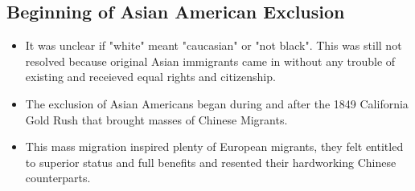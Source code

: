 \documentclass{article}
\begin{document}
\subsection{Beginning of Asian American Exclusion}
\begin{itemize}
  \item It was unclear if "white" meant "caucasian" or "not black".
    This was still not resolved because original Asian immigrants came in 
    without any trouble of existing and receieved equal rights and citizenship.
  \item The exclusion of Asian Americans began during and after the 1849 California Gold Rush
    that brought masses of Chinese Migrants.
  \item This mass migration inspired plenty of European migrants, they felt
    entitled to superior status and full benefits and resented their hardworking
    Chinese counterparts.
\end{itemize}
\end{document}
